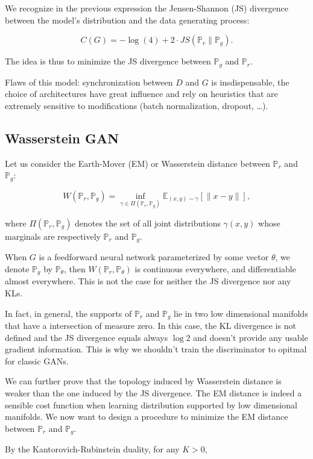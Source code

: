 We recognize in the previous expression the Jensen-Shannon (JS) divergence
between the model's distribution and the data generating process:

\[ C(G) = -\log(4) + 2 \cdot JS(\mathbb{P}_r\|\mathbb{P}_g). \]

The idea is thus to minimize the JS divergence between $\mathbb{P}_g$
and $\mathbb{P}_r$.

Flaws of this model:
synchronization between $D$ and $G$ is insdispensable,
the choice of architectures have great influence and
rely on heuristics that are extremely sensitive to modifications
(batch normalization, dropout, \dots).

\subsection*{Wasserstein GAN}

Let us consider the Earth-Mover (EM) or Wasserstein distance between
$\mathbb{P}_r$ and $\mathbb{P}_g$:

\[
  W(\mathbb{P}_r, \mathbb{P}_g)
  = \inf_{\gamma\in\Pi(\mathbb{P}_r, \mathbb{P}_g)}
  \mathbb{E}_{(x,y)\sim\gamma}[\|x-y\|],
\]

where $\Pi(\mathbb{P}_r, \mathbb{P}_g)$ denotes the set of all joint
distributions $\gamma(x, y)$ whose marginals are respectively $\mathbb{P}_r$
and $\mathbb{P}_g$.

When $G$ is a feedforward neural network parameterized by some vector $\theta$,
we denote $\mathbb{P}_g$ by $\mathbb{P}_{\theta}$, then
$W(\mathbb{P}_r, \mathbb{P}_{\theta})$ is continuous everywhere, and
differentiable almost everywhere. This is not the case for neither the JS
divergence nor any KLs.

In fact, in general, the supports of $\mathbb{P}_r$ and $\mathbb{P}_g$ lie
in two low dimensional manifolds that have a intersection of measure zero.
In this case, the KL divergence is not defined and the JS
divergence equals always $\log2$ and doesn't provide any usable gradient
information. This is why we shouldn't train the discriminator to opitmal
for classic GANs.

We can further prove that the topology induced by Wasserstein distance is
weaker than the one induced by the JS divergence. The EM distance is indeed a
sensible cost function when learning distribution supported by low
dimensional manifolds. We now want to design a procedure to minimize the EM
distance between $\mathbb{P}_r$ and $\mathbb{P}_g$.

By the Kantorovich-Rubinstein duality, for any $K > 0$,

